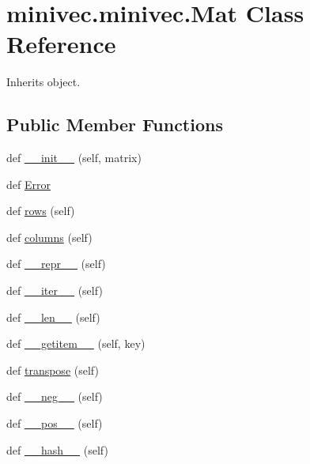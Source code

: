 \hypertarget{classminivec_1_1minivec_1_1_mat}{}\section{minivec.\+minivec.\+Mat Class Reference}
\label{classminivec_1_1minivec_1_1_mat}


Inherits object.

\subsection*{Public Member Functions}
\begin{DoxyCompactItemize}
\item 
def \hyperlink{classminivec_1_1minivec_1_1_mat_a0ccec2a7a5c671a2480ad44d95139bd5}{\+\_\+\+\_\+init\+\_\+\+\_\+} (self, matrix)
\item 
def \hyperlink{classminivec_1_1minivec_1_1_mat_ac149ada48e389858031f6b403ccfeb48}{Error}
\item 
def \hyperlink{classminivec_1_1minivec_1_1_mat_a0123fedc9f3e934a482679cbc8ffee85}{rows} (self)
\item 
def \hyperlink{classminivec_1_1minivec_1_1_mat_a0ca8a3d1a061e7a6176e64e6ed223287}{columns} (self)
\item 
def \hyperlink{classminivec_1_1minivec_1_1_mat_a5d2f01b4f68e0098b0fb506522cdf3a8}{\+\_\+\+\_\+repr\+\_\+\+\_\+} (self)
\item 
def \hyperlink{classminivec_1_1minivec_1_1_mat_a7d46922c3211f2d733a05e1e22e0f71a}{\+\_\+\+\_\+iter\+\_\+\+\_\+} (self)
\item 
def \hyperlink{classminivec_1_1minivec_1_1_mat_ab013df7f6f0c343b8b103d20edd6a210}{\+\_\+\+\_\+len\+\_\+\+\_\+} (self)
\item 
def \hyperlink{classminivec_1_1minivec_1_1_mat_aaacf493226ec98915945f33bf08b9c28}{\+\_\+\+\_\+getitem\+\_\+\+\_\+} (self, key)
\item 
def \hyperlink{classminivec_1_1minivec_1_1_mat_a8f5b48d14f1ce0a369ff0268c626d1b0}{transpose} (self)
\item 
def \hyperlink{classminivec_1_1minivec_1_1_mat_aec9ab0f8d51536378eb4996a20e9ddaf}{\+\_\+\+\_\+neg\+\_\+\+\_\+} (self)
\item 
def \hyperlink{classminivec_1_1minivec_1_1_mat_a7feea87679c40a70812b04d1fb2687dc}{\+\_\+\+\_\+pos\+\_\+\+\_\+} (self)
\item 
def \hyperlink{classminivec_1_1minivec_1_1_mat_ade21bafa48994648e4ee0a15497997d4}{\+\_\+\+\_\+hash\+\_\+\+\_\+} (self)

\end{DoxyCompactItemize}
